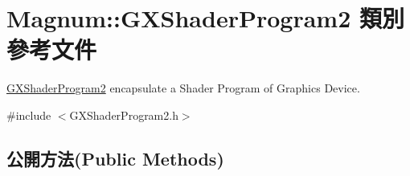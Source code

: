 \hypertarget{class_magnum_1_1_g_x_shader_program2}{}\section{Magnum\+:\+:G\+X\+Shader\+Program2 類別 參考文件}
\label{class_magnum_1_1_g_x_shader_program2}


\hyperlink{class_magnum_1_1_g_x_shader_program2}{G\+X\+Shader\+Program2} encapsulate a Shader Program of Graphics Device.  




{\ttfamily \#include $<$G\+X\+Shader\+Program2.\+h$>$}

\subsection*{公開方法(Public Methods)}
